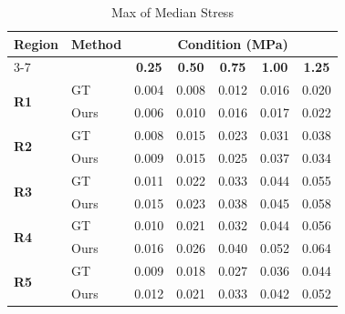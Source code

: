 \documentclass{article}
\begin{document}
\thispagestyle{empty}

\begin{table}[h]
\centering
\caption{Max of Median Stress}
\vspace{0.3cm}
\begin{tabular}{llccccc}
\toprule
\textbf{Region} & \textbf{Method} & \multicolumn{5}{c}{\textbf{Condition (MPa)}} \\
\cmidrule(lr){3-7}
& & \textbf{0.25} & \textbf{0.50} & \textbf{0.75} & \textbf{1.00} & \textbf{1.25} \\
\midrule
\multirow{2}{*}{\textbf{R1}} & GT  & 0.004 & 0.008 & 0.012 & 0.016 & 0.020 \\
 & Ours  & 0.006 & 0.010 & 0.016 & 0.017 & 0.022 \\ \midrule
\multirow{2}{*}{\textbf{R2}} & GT  & 0.008 & 0.015 & 0.023 & 0.031 & 0.038 \\
 & Ours  & 0.009 & 0.015 & 0.025 & 0.037 & 0.034 \\ \midrule
\multirow{2}{*}{\textbf{R3}} & GT  & 0.011 & 0.022 & 0.033 & 0.044 & 0.055 \\
 & Ours  & 0.015 & 0.023 & 0.038 & 0.045 & 0.058 \\ \midrule
\multirow{2}{*}{\textbf{R4}} & GT  & 0.010 & 0.021 & 0.032 & 0.044 & 0.056 \\
 & Ours  & 0.016 & 0.026 & 0.040 & 0.052 & 0.064 \\ \midrule
\multirow{2}{*}{\textbf{R5}} & GT  & 0.009 & 0.018 & 0.027 & 0.036 & 0.044 \\
 & Ours  & 0.012 & 0.021 & 0.033 & 0.042 & 0.052 \\
\bottomrule
\end{tabular}
\end{table}
\end{document}
